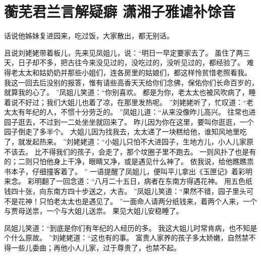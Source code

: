 \chapter{蘅芜君兰言解疑癖 \quad 潇湘子雅谑补馀音}
\par
{}\par
{}\par
话说他姊妹复进园来，吃过饭，大家散出，都无别话。
\par
且说刘姥姥带着板儿，先来见凤姐儿，说：“明日一早定要家去了。
虽住了两三天，日子却不多，把古往今来没见过的，没吃过的，没听见过的，都经验了。
难得老太太和姑奶奶并那些小姐们，连各房里的姑娘们，都这样怜贫惜老照看我。
我这一回去后没别的报答，惟有请些高香天天给你们念佛，保佑你们长命百岁的，就算我的心了。
”凤姐儿笑道：“你别喜欢。
都是为你，老太太也被风吹病了，睡着说不好过；我们大姐儿也着了凉，在那里发热呢。
”刘姥姥听了，忙叹道：“老太太有年纪的人，不惯十分劳乏的。
”凤姐儿道：“从来没像昨儿高兴。
往常也进园子逛去，不过到一二处坐坐就回来了。
昨儿因为你在这里，要叫你逛逛，一个园子倒走了多半个。
大姐儿因为找我去，太太递了一块糕给他，谁知风地里吃了，就发起热来。
”刘姥姥道：“小姐儿只怕不大进园子，生地方儿，小人儿家原不该去。
比不得我们的孩子，会走了，那个坟圈子里不跑去。
一则风扑了也是有的；二则只怕他身上干净，眼睛又净，或是遇见什么神了。
依我说，给他瞧瞧祟书本子，仔细撞客着了。
”
一语提醒了凤姐儿，便叫平儿拿出《玉匣记》着彩明来念。
彩明翻了一回念道：“八月二十五日，病者在东南方得遇花神。
用五色纸钱四十张，向东南方四十步送之，大吉。
”凤姐儿笑道：“果然不错，园子里头可不是花神！只怕老太太也是遇见了。
”一面命人请两分纸钱来，着两个人来，一个与贾母送祟，一个与大姐儿送祟。
果见大姐儿安稳睡了。
\par
凤姐儿笑道：“到底是你们有年纪的人经历的多。
我这大姐儿时常肯病，也不知是个什么原故。
”刘姥姥道：“这也有的事。
富贵人家养的孩子多太娇嫩，自然禁不得一些儿委曲；再他小人儿家，过于尊贵了，也禁不起。
